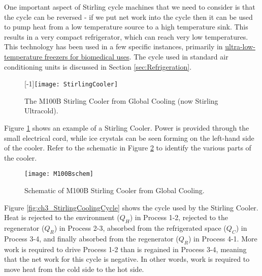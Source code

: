 One important aspect of Stirling cycle machines that we need to consider is that the cycle can be reversed - if we put net work into the cycle then it can be used to pump heat from a low temperature source to a high temperature sink.  This results in a very compact refrigerator, which can reach very low temperatures.  This technology has been used in a few specific instances, primarily in \href{https://www.stirlingultracold.com}{ultra-low-temperature freezers for biomedical uses}.  The cycle used in standard air conditioning units is discussed in Section \ref{sec:Refrigeration}.

\begin{figure}[H]
\centering
\scalebox{1}[-1]{\texttt{[image: StirlingCooler]}}
\caption{The M100B Stirling Cooler from Global Cooling (now Stirling Ultracold).}
\label{fig:ch3_stirlingCooler}
\end{figure}

Figure \ref{fig:ch3_stirlingCooler} shows an example of a Stirling Cooler.  Power is provided through the small electrical cord, while ice crystals can be seen forming on the left-hand side of the cooler.  Refer to the schematic in Figure \ref{fig:ch3_M100BSchematic} to identify the various parts of the cooler.

\begin{figure}[H]
\centering
\texttt{[image: M100Bschem]}
\caption{Schematic of M100B Stirling Cooler from Global Cooling.}
\label{fig:ch3_M100BSchematic}
\end{figure}


Figure \ref{fig:ch3_StirlingCoolingCycle} shows the cycle used by the Stirling Cooler.  Heat is rejected to the environment ($Q_H$) in Process 1-2, rejected to the regenerator ($Q_R$) in Process 2-3, absorbed from the refrigerated space ($Q_C$) in Process 3-4, and finally absorbed from the regenerator ($Q_R$) in Process 4-1. More work is required to drive Process 1-2 than is regained in Process 3-4, meaning that the net work for this cycle is negative.  In other words, work is required to move heat from the cold side to the hot side.

